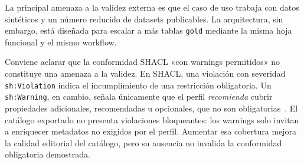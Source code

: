 La principal amenaza a la validez externa es que el caso de uso trabaja con datos sintéticos y un número reducido de datasets publicables. La arquitectura, sin embargo, está diseñada para escalar a más tablas \texttt{gold} mediante la misma hoja funcional y el mismo workflow.

Conviene aclarar que la conformidad \ac{SHACL} «con warnings permitidos» no constituye una amenaza a la validez. En \ac{SHACL}, una violación con severidad \texttt{sh:Violation} indica el incumplimiento de una restricción obligatoria. Un \texttt{sh:Warning}, en cambio, señala únicamente que el perfil \emph{recomienda} cubrir propiedades adicionales, recomendadas u opcionales, que no son obligatorias~\cite{w3cShacl}. El catálogo exportado no presenta violaciones bloqueantes: los warnings solo invitan a enriquecer metadatos no exigidos por el perfil. Aumentar esa cobertura mejora la calidad editorial del catálogo, pero su ausencia no invalida la conformidad obligatoria demostrada.
